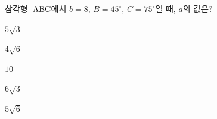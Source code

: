 삼각형~$\mathrm{ABC}$에서 $b=8$, $B=45^\circ$, $C=75^\circ$일 때, $a$의 값은?
\begin{choices32}{\rule[-3ex]{0pt}{8ex}$5\sqrt{3}$}{\rule[-3ex]{0pt}{8ex}$4\sqrt{6}$}{\rule[-3ex]{0pt}{8ex}$10$}{\rule[-3ex]{0pt}{8ex}$6\sqrt{3}$}{\rule[-3ex]{0pt}{8ex}$5\sqrt{6}$}\end{choices32}

